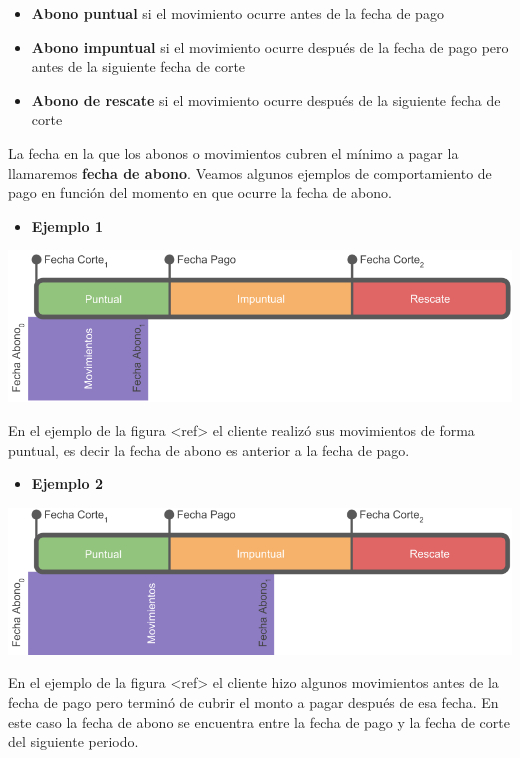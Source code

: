 \documentclass[]{book}
\providecommand{\tightlist}{%
  \setlength{\itemsep}{0pt}\setlength{\parskip}{0pt}}
\begin{document}
\begin{itemize}
\tightlist
\item
  \textbf{Abono puntual} si el movimiento ocurre antes de la fecha de pago
\item
  \textbf{Abono impuntual} si el movimiento ocurre después de la fecha de pago pero antes de la siguiente fecha de corte
\item
  \textbf{Abono de rescate} si el movimiento ocurre después de la siguiente fecha de corte
\end{itemize}

La fecha en la que los abonos o movimientos cubren el mínimo a pagar la llamaremos \textbf{fecha de abono}. Veamos algunos ejemplos de comportamiento de pago en función del momento en que ocurre la fecha de abono.

\begin{itemize}
\tightlist
\item
  \textbf{Ejemplo 1}
\end{itemize}

\includegraphics{images/movs_1.png}

En el ejemplo de la figura \textless{}ref\textgreater{} el cliente realizó sus movimientos de forma puntual, es decir la fecha de abono es anterior a la fecha de pago.

\begin{itemize}
\tightlist
\item
  \textbf{Ejemplo 2}
\end{itemize}

\includegraphics{images/movs_2.png}

En el ejemplo de la figura \textless{}ref\textgreater{} el cliente hizo algunos movimientos antes de la fecha de pago pero terminó de cubrir el monto a pagar después de esa fecha. En este caso la fecha de abono se encuentra entre la fecha de pago y la fecha de corte del siguiente periodo.
\end{document}
